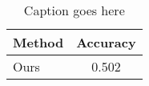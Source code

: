 \begin{table}[t]
\centering

\begin{tabular}{lc}
\toprule
Method & Accuracy \\
\midrule
Ours & 0.502 \\
\bottomrule
\end{tabular}

\caption{
Caption goes here
}
\vspace{-0.05in}
\label{tab:template}
\end{table}
